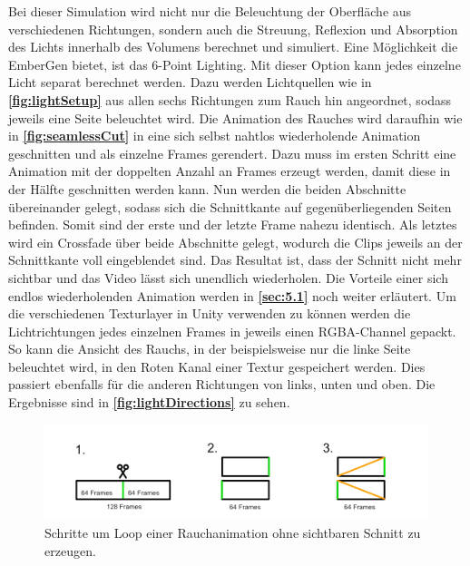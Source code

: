 Bei dieser Simulation wird nicht nur die Beleuchtung der Oberfläche aus verschiedenen Richtungen, sondern auch die Streuung, Reflexion und Absorption des Lichts innerhalb
des Volumens berechnet und simuliert.
Eine Möglichkeit die EmberGen bietet, ist das 6-Point Lighting.
Mit dieser Option kann jedes einzelne Licht separat berechnet werden. Dazu werden Lichtquellen wie in \textbf{\autoref{fig:lightSetup}} aus allen sechs Richtungen zum Rauch hin angeordnet,
sodass jeweils eine Seite beleuchtet wird.
Die Animation des Rauches wird daraufhin wie in \textbf{\autoref{fig:seamlessCut}} in eine sich selbst nahtlos wiederholende Animation
geschnitten und als einzelne Frames gerendert. Dazu muss im ersten Schritt eine Animation mit der doppelten Anzahl an Frames erzeugt werden, damit diese in der Hälfte
geschnitten werden kann. Nun werden die beiden Abschnitte übereinander gelegt, sodass sich die Schnittkante auf gegenüberliegenden Seiten befinden. Somit sind der erste
und der letzte Frame nahezu identisch. Als letztes wird ein Crossfade über beide Abschnitte gelegt, wodurch die Clips jeweils an der Schnittkante voll eingeblendet
sind. Das Resultat ist, dass der Schnitt nicht mehr sichtbar und das Video lässt sich unendlich wiederholen. Die Vorteile einer sich endlos wiederholenden Animation werden in \textbf{\autoref{sec:5.1}}
noch weiter erläutert.
Um die verschiedenen Texturlayer in Unity verwenden zu können werden die Lichtrichtungen jedes einzelnen Frames in jeweils einen RGBA-Channel gepackt.
So kann die Ansicht des Rauchs, in der beispielsweise nur die linke Seite beleuchtet wird, in den Roten Kanal einer Textur gespeichert werden.
Dies passiert ebenfalls für die anderen Richtungen von links, unten und oben. Die Ergebnisse sind in \textbf{\autoref{fig:lightDirections}} zu sehen.



\begin{figure}[h!]
	\includegraphics[width=\textwidth]{Grafiken/Implementation/Lightmaps/SeamlessCut.png}
	\centering
	\begin{footnotesize}
		\caption{Schritte um Loop einer Rauchanimation ohne sichtbaren Schnitt zu erzeugen. }
		\label{fig:seamlessCut}
	\end{footnotesize}
\end{figure}

